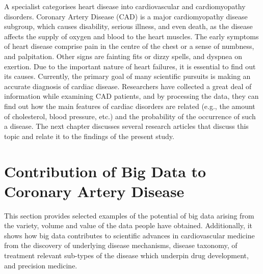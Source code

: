 \documentclass[sigconf]{acmart}
\begin{document}
A specialist categorises heart disease into cardiovascular and cardiomyopathy disorders.
Coronary Artery Disease (CAD) is a major cardiomyopathy disease subgroup, which causes disability, serious illness, and even death, as the disease affects the supply of oxygen and blood to the heart muscles.
The early symptoms of heart disease comprise pain in the centre of the chest or a sense of numbness, and palpitation.
Other signs are fainting fits or dizzy spells, and dyspnea on exertion.
Due to the important nature of heart failures, it is essential to find out its causes.
Currently, the primary goal of many scientific pursuits is making an accurate diagnosis of cardiac disease.
Researchers have collected a great deal of information while examining CAD patients, and by processing the data, they can find out how the main features of cardiac disorders are related (e.g.,  the amount of cholesterol, blood pressure, etc.) and the probability of the occurrence of such a disease.
The next chapter discusses several research articles that discuss this topic and relate it to the findings of the present study.


\section{Contribution of Big Data to Coronary Artery Disease}

This section provides selected examples of the potential of big data arising from the variety, volume and value of the data people have obtained.
Additionally, it shows how big data contributes to scientific advances in cardiovascular medicine from the discovery of underlying disease mechanisms, disease taxonomy, of treatment relevant sub-types of the disease which underpin drug development, and precision medicine.
\end{document}
